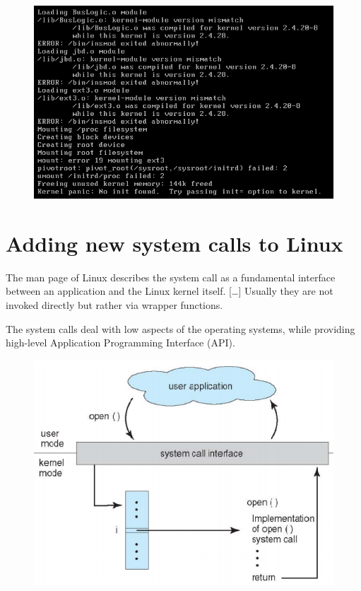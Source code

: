 \documentclass{article}
\begin{document}
\begin{figure}
\centering
  \includegraphics[width=\textwidth]{./kernel_panic.png}
\end{figure}


\section{Adding new system calls to Linux}
The man page of Linux describes the system call as a fundamental interface between an application and
the Linux kernel itself. [\dots] Usually they are not invoked directly but rather via wrapper functions.

The system calls deal with low aspects of the operating systems, while providing high-level Application
Programming Interface (API). 

\begin{figure}
\centering
  \includegraphics[width=\textwidth]{./syscall.png}
\end{figure}
\end{document}
